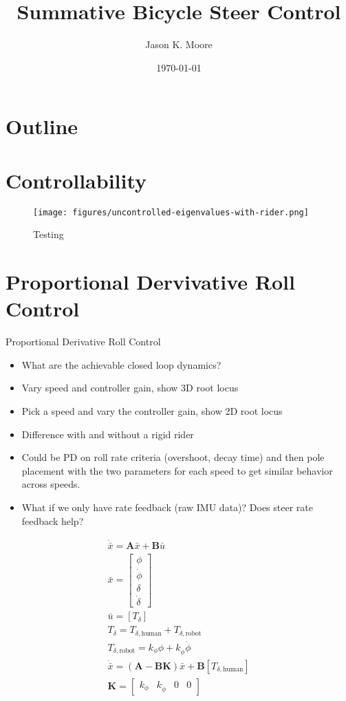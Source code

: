 \documentclass[12pt]{article}
\title{Summative Bicycle Steer Control}
\author{Jason K. Moore}
\date{\today}
\begin{document}
\maketitle

\section{Outline}

\section{Controllability}

\begin{figure}
  \centering
  \texttt{[image: figures/uncontrolled-eigenvalues-with-rider.png]}
  \caption{Testing}
  \label{fig:uncontrolled-eigenvalues-with-rider}
\end{figure}

\section{Proportional Dervivative Roll Control}

Proportional Derivative Roll Control

\begin{itemize}
  \item What are the achievable closed loop dynamics?
  \item Vary speed and controller gain, show 3D root locus
  \item Pick a speed and vary the controller gain, show 2D root locus
  \item Difference with and without a rigid rider
  \item Could be PD on roll rate criteria (overshoot, decay time) and then pole
    placement with the two parameters for each speed to get similar behavior
    across speeds.
  \item What if we only have rate feedback (raw IMU data)? Does steer rate
    feedback help?
\end{itemize}

\begin{align}
  \dot{\bar{x}} = \mathbf{A} \bar{x} + \mathbf{B} \bar{u} \\
  \bar{x} = \begin{bmatrix} \phi \\ \dot{\phi} \\ \delta \\ \dot{\delta} \end{bmatrix} \\
  \bar{u} = \left[ T_\delta \right] \\
  T_\delta = T_{\delta,\textrm{human}} + T_{\delta,\textrm{robot}} \\
  T_{\delta,\textrm{robot}} = k_\phi \phi + k_{\dot{\phi}} \dot{\phi} \\
  \dot{\bar{x}} = \left( \mathbf{A} - \mathbf{B} \mathbf{K} \right) \bar{x} + \mathbf{B} \left[ T_{\delta,\textrm{human}} \right] \\
  \mathbf{K} = \begin{bmatrix} k_\phi & k_{\dot{\phi}} & 0 & 0 \end{bmatrix}
\end{align}
\end{document}
